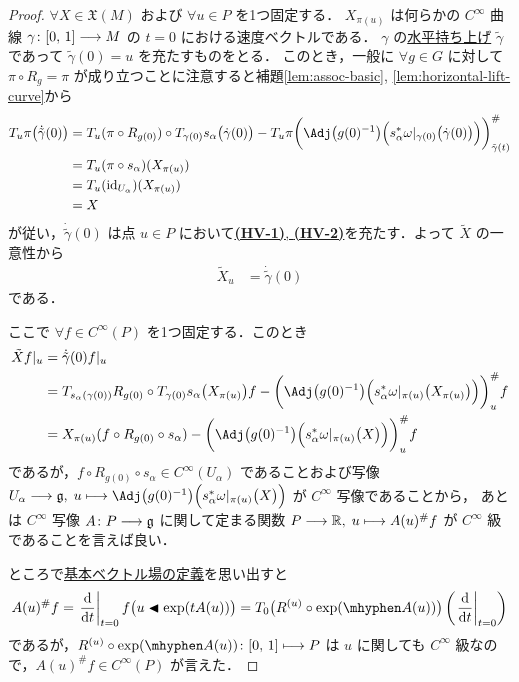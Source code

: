 \documentclass[TQFT_main]{subfiles}
\begin{document}
\begin{proof}
    $\forall X \in \mathfrak{X}(M)$ および $\forall u \in P$ を1つ固定する．
    $X_{\pi(u)}$ は何らかの $C^\infty$ 曲線 $\gamma \colon [0,\, 1] \longrightarrow M$ の $t=0$ における速度ベクトルである．
    $\gamma$ の\hyperref[def:horizontal-lift-curve]{水平持ち上げ} $\tilde{\gamma}$ であって $\tilde{\gamma} (0) = u$ を充たすものをとる．
    このとき，一般に $\forall g \in G$ に対して $\pi \circ R_g = \pi$  が成り立つことに注意すると補題\ref{lem:assoc-basic}, \ref{lem:horizontal-lift-curve}から
    \begin{align}
        T_u \pi \bigl(\dot{\tilde{\gamma}} (0)\bigr)
        &= T_{u} (\pi \circ R_{g(0)}) \circ T_{\gamma(0)} s_\alpha \bigl( \dot{\gamma}(0) \bigr) - T_u \pi \biggl(\Adj \bigl( g(0)^{-1} \bigr) \Bigl( s_\alpha^* \omega|_{\gamma(0)}\bigl(\dot{\gamma}(0)\bigr) \Bigr) \biggr)^\#_{\tilde{\gamma}(t)} \\
        &= T_u (\pi \circ s_\alpha) (X_{\pi(u)}) \\
        &= T_u (\mathrm{id}_{U_\alpha}) (X_{\pi(u)}) \\
        &= X
    \end{align}
    が従い，$\dot{\tilde{\gamma}}(0)$ は点 $u \in P$ において\hyperref[def:horizontal-lift-vecf]{\textbf{\textsf{(HV-1)}}, \textsf{\textbf{(HV-2)}}}を充たす．よって $\tilde{X}$ の一意性から
    \begin{align}
        \tilde{X}_{u} 
        &= \dot{\tilde{\gamma}}(0)
    \end{align}
    である．

    ここで $\forall f \in C^\infty (P)$ を1つ固定する．このとき
    \begin{align}
        \tilde{X} f|_u
        &= \dot{\tilde{\gamma}}(0) f|_u \\
        &= T_{s_\alpha(\gamma(0))} R_{g(0)} \circ T_{\gamma(0)} s_\alpha \bigl( X_{\pi(u)} \bigr) f - \biggl(\Adj \bigl( g(0)^{-1} \bigr) \Bigl( s_\alpha^* \omega|_{\pi(u)}\bigl(X_{\pi(u)}\bigr) \Bigr) \biggr)^\#_{u} f \\
        &= X_{\pi(u)} (f \circ R_{g(0)} \circ s_\alpha) - \biggl(\Adj \bigl( g(0)^{-1} \bigr) \Bigl( s_\alpha^* \omega|_{\pi(u)}\bigl(X\bigr) \Bigr) \biggr)^\#_{u} f
    \end{align}
    であるが，$f \circ R_{g(0)} \circ s_\alpha \in C^\infty(U_\alpha)$ であることおよび写像 $U_\alpha \lto \mathfrak{g},\;  u \lmto \Adj \bigl( g(0)^{-1} \bigr) \Bigl( s_\alpha^* \omega|_{\pi(u)}\bigl(X\bigr) \Bigr)$ が $C^\infty$ 写像であることから，
    あとは $C^\infty$ 写像 $A \colon P \longrightarrow \mathfrak{g}$ に関して定まる関数 $P \longrightarrow \mathbb{R},\; u \longmapsto A(u)^\# f$ が $C^\infty$ 級であることを言えば良い．
    
    ところで\hyperref[def:fundamental-vecf]{基本ベクトル場の定義}を思い出すと
    \begin{align}
        A(u)^\# f = \eval{\dv{}{t}}_{t=0} f \bigl( u \btl \exp(t A(u)) \bigr) = T_{0} \bigl( R^{(u)} \circ \exp (\mhyphen A(u)) \bigr) \left( \eval{\dv{}{t}}_{t=0} \right) 
    \end{align}
    であるが，$R^{(u)} \circ \exp (\mhyphen A(u)) \colon [0,\, 1] \lmto P$ は $u$ に関しても $C^\infty$ 級なので，$A(u)^\# f \in C^\infty (P)$ が言えた．
\end{proof}
\end{document}
